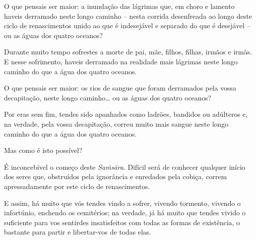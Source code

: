 O que pensais ser maior: a inundação das lágrimas que, em choro e lamento haveis
derramado neste longo caminho -- nesta corrida desenfreada ao longo deste ciclo
de renascimentos unido ao que é indesejável e separado do que é desejável -- ou
as águas dos quatro oceanos?

Durante muito tempo sofrestes a morte de pai, mãe, filhos, filhas, irmãos e
irmãs. E nesse sofrimento, haveis derramado na realidade mais lágrimas neste
longo caminho do que a água dos quatro oceanos.

O que pensais ser maior: os rios de sangue que foram derramados pela vossa
decapitação, neste longo caminho\ldots{} ou as águas dos quatro oceanos?

Por eras sem fim, tendes sido apanhados como ladrões, bandidos ou adúlteros e,
na verdade, pela vossa decapitação, correu muito mais sangue neste longo caminho
do que a água dos quatro oceanos.

Mas como é isto possível?

É inconcebível o começo deste \emph{Saṁsāra}. Difícil será de conhecer qualquer
início dos seres que, obstruídos pela ignorância e enredados pela cobiça, correm
apressadamente por este ciclo de renascimentos.


E assim, há muito que vós tendes vindo a sofrer, vivendo tormento, vivendo o
infortúnio, enchendo os cemitérios; na verdade, já há muito que tendes vivido o
suficiente para vos sentirdes insatisfeitos com todas as formas de existência, o
bastante para partir e libertar-vos de todas elas.

